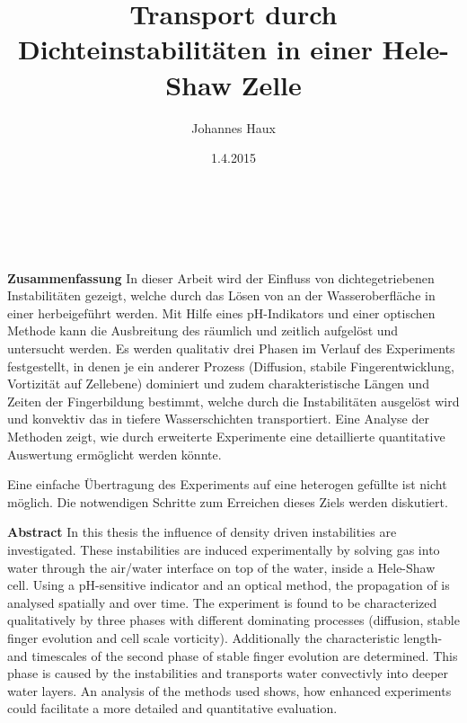 \documentclass[twoside, a4paper, DIV=11,twocolumn]{book}
\title{Transport durch Dichteinstabilitäten in einer Hele-Shaw Zelle}
\author{Johannes Haux}
\date{1.4.2015}
\begin{document}
\onecolumn

\emptypage

\newpage
{}

\chapter*{\,}

  \noindent \textbf{Zusammenfassung} \hspace{0.3cm} In dieser Arbeit wird der Einfluss von dichtegetriebenen Instabilitäten gezeigt, welche durch das Lösen von \COT an der Wasseroberfläche in einer \HSC herbeigeführt werden. 
  Mit Hilfe eines pH-Indikators und einer optischen Methode kann die Ausbreitung des \COT räumlich und zeitlich aufgelöst und untersucht werden. 
  Es werden qualitativ drei Phasen im Verlauf des Experiments festgestellt, in denen je ein anderer Prozess (Diffusion, stabile Fingerentwicklung, Vortizität auf Zellebene) dominiert und zudem charakteristische Längen und Zeiten der Fingerbildung bestimmt, welche durch die Instabilitäten ausgelöst wird und konvektiv das \COT in tiefere Wasserschichten transportiert.
  Eine Analyse der Methoden zeigt, wie durch erweiterte Experimente eine detaillierte quantitative Auswertung ermöglicht werden könnte.
  
  Eine einfache Übertragung des Experiments auf eine heterogen gefüllte \HSC ist nicht möglich. Die notwendigen Schritte zum Erreichen dieses Ziels werden diskutiert.
  
  \vspace{1.5cm}
 
  \noindent \textbf{Abstract} \hspace{0.3cm} In this thesis the influence of density driven instabilities are investigated. These instabilities are induced experimentally by solving \COTm gas into water through the air/water interface on top of the water, inside a Hele-Shaw cell. 
  Using a pH-sensitive indicator and an optical method, the propagation of \COT is analysed spatially and over time.
  The experiment is found to be characterized qualitatively by three phases with different dominating processes (diffusion, stable finger evolution and cell scale vorticity). Additionally the characteristic length- and timescales of the second phase of stable finger evolution are determined. This phase is caused by the instabilities and transports water convectivly into deeper water layers. 
  An analysis of the methods used shows, how enhanced experiments could facilitate a more detailed and quantitative evaluation. 
  
\end{document}
